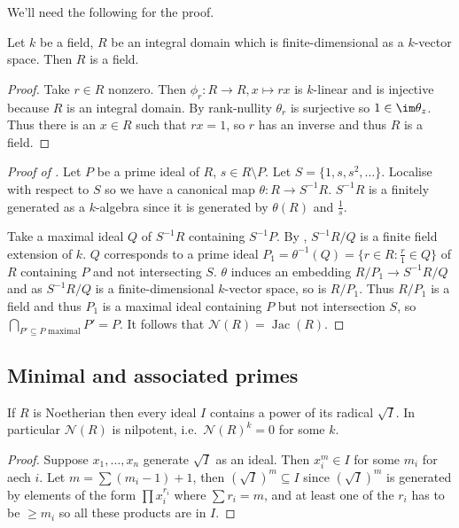 \documentclass[a4paper]{article}
\newcommand{\nilrad}[1]{\mathcal{N}({#1})} %
\newcommand{\jac}[1]{\operatorname{Jac}({#1})} %
\begin{document}
We'll need the following for the proof.
\begin{lemma}
  Let \(k\) be a field, \(R\) be an integral domain which is finite-dimensional as a \(k\)-vector space. Then \(R\) is a field.
\end{lemma}

\begin{proof}
  Take \(r \in R\) nonzero. Then \(\phi_r: R \to R, x \mapsto rx\) is \(k\)-linear and is injective because \(R\) is an integral domain. By rank-nullity \(\theta_r\) is surjective so \(1 \in \im \theta_z\). Thus there is an \(x \in R\) such that \(rx = 1\), so \(r\) has an inverse and thus \(R\) is a field.
\end{proof}

\begin{proof}[Proof of ]
  Let \(P\) be a prime ideal of \(R\), \(s \in R \setminus P\). Let \(S = \{1, s, s^2, \dots \}\). Localise with respect to \(S\) so we have a canonical map \(\theta: R \to S^{-1}R\). \(S^{-1}R\) is a finitely generated as a \(k\)-algebra since it is generated by \(\theta(R)\) and \(\frac{1}{s}\).

  Take a maximal ideal \(Q\) of \(S^{-1}R\) containing \(S^{-1}P\). By , \(S^{-1}R/Q\) is a finite field extension of \(k\). \(Q\) corresponds to a prime ideal \(P_1 = \theta^{-1}(Q) = \{r \in R: \frac{r}{1} \in Q\}\) of \(R\) containing \(P\) and not intersecting \(S\). \(\theta\) induces an embedding \(R/P_1 \to S^{-1}R/Q\) and as \(S^{-1}R/Q\) is a finite-dimensional \(k\)-vector space, so is \(R/P_1\). Thus \(R/P_1\) is a field and thus \(P_1\) is a maximal ideal containing \(P\) but not intersection \(S\), so \(\bigcap_{P' \subseteq P \text{ maximal}} P' = P\). It follows that \(\nilrad R = \jac R\).
\end{proof}

\subsection{Minimal and associated primes}

\begin{lemma}
  If \(R\) is Noetherian then every ideal \(I\) contains a power of its radical \(\sqrt I\). In particular \(\nilrad R\) is nilpotent, i.e.\ \(\nilrad R^k = 0\) for some \(k\).
\end{lemma}

\begin{proof}
  Suppose \(x_1, \dots, x_n\) generate \(\sqrt I\) as an ideal. Then \(x_i^m \in I\) for some \(m_i\) for aech \(i\). Let \(m = \sum (m_i - 1) + 1\), then \((\sqrt I)^m \subseteq I\) since \((\sqrt I)^m\) is generated by elements of the form \(\prod x_i^{r_i}\) where \(\sum r_i = m\), and at least one of the \(r_i\) has to be \(\geq m_i\) so all these products are in \(I\).
\end{proof}
\end{document}
